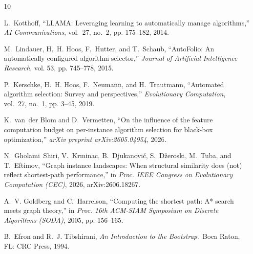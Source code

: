 \documentclass[conference]{IEEEtran}
\renewenvironment{thebibliography}[1]{%
  \begin{oldthebibliography}{#1}%
    \setlength{\itemsep}{0pt}%
    \setlength{\parskip}{0pt}%
}{%
  \end{oldthebibliography}%
}
\begin{document}
\begin{thebibliography}{10}
L.~Kotthoff, ``{LLAMA}: Leveraging learning to automatically manage algorithms,'' \emph{AI Communications}, vol.~27, no.~2, pp. 175--182, 2014.

M.~Lindauer, H.~H. Hoos, F.~Hutter, and T.~Schaub, ``{AutoFolio}: An automatically configured algorithm selector,'' \emph{Journal of Artificial Intelligence Research}, vol. 53, pp. 745--778, 2015.

P.~Kerschke, H.~H. Hoos, F.~Neumann, and H.~Trautmann, ``Automated algorithm selection: Survey and perspectives,'' \emph{Evolutionary Computation}, vol.~27, no.~1, pp. 3--45, 2019.

K.~van~der Blom and D.~Vermetten, ``On the influence of the feature computation budget on per-instance algorithm selection for black-box optimization,'' \emph{arXiv preprint arXiv:2605.04954}, 2026.

N.~Gholami~Shiri, V.~Krminac, B.~Djukanovi{\'c}, S.~D{\v{z}}eroski, M.~Tuba, and T.~Eftimov, ``Graph instance landscapes: When structural similarity does (not) reflect shortest-path performance,'' in \emph{Proc. IEEE Congress on Evolutionary Computation (CEC)}, 2026, arXiv:2606.18267.

A.~V. Goldberg and C.~Harrelson, ``Computing the shortest path: {A}* search meets graph theory,'' in \emph{Proc. 16th ACM-SIAM Symposium on Discrete Algorithms (SODA)}, 2005, pp. 156--165.

B.~Efron and R.~J. Tibshirani, \emph{An Introduction to the Bootstrap}.\ Boca Raton, FL: CRC Press, 1994.

\end{thebibliography}
\end{document}
